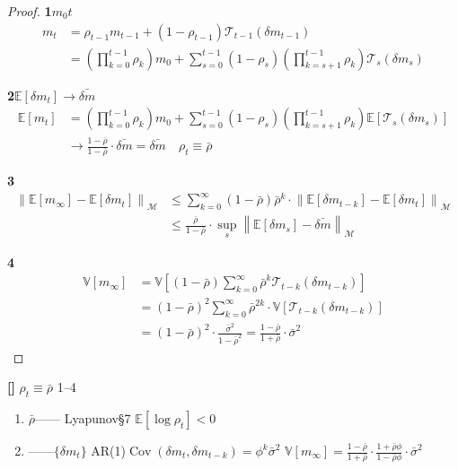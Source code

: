 \documentclass[11pt,a4paper]{article}
\theoremstyle{remark}
\DeclareMathOperator{\Cov}{Cov}
\newcommand{\Mmem}{\mathcal{M}}
\newcommand{\E}{\mathbb{E}}
\newcommand{\V}{\mathbb{V}}
\newcommand{\norm}[1]{\left\lVert#1\right\rVert}
\newcommand{\rigorous}{\textnormal{\textbf{[]}}}
\begin{document}
\begin{proof}
\textbf{1}$m_0$$t$
\begin{align}
    m_t &= \rho_{t-1} m_{t-1} + (1-\rho_{t-1})\mathcal{T}_{t-1}(\delta m_{t-1}) \nonumber\\
    &= \left(\prod_{k=0}^{t-1} \rho_k\right) m_0
       + \sum_{s=0}^{t-1} (1-\rho_s)\left(\prod_{k=s+1}^{t-1} \rho_k\right) \mathcal{T}_s(\delta m_s)
\end{align}

\textbf{2}$\E[\delta m_t] \to \bar{\delta m}$
\begin{align}
    \E[m_t] &= \left(\prod_{k=0}^{t-1} \rho_k\right) m_0
              + \sum_{s=0}^{t-1} (1-\rho_s)\left(\prod_{k=s+1}^{t-1} \rho_k\right) \E[\mathcal{T}_s(\delta m_s)] \nonumber\\
    &\to \frac{1-\bar{\rho}}{1-\bar{\rho}} \cdot \bar{\delta m}
       = \bar{\delta m} \quad\text{$\rho_t \equiv \bar{\rho}$}
\end{align}

\textbf{3}
\begin{align}
    \norm{\E[m_\infty] - \E[\delta m_t]}_{\Mmem}
    &\leq \sum_{k=0}^{\infty} (1-\bar{\rho})\bar{\rho}^k \cdot \norm{\E[\delta m_{t-k}] - \E[\delta m_t]}_{\Mmem} \nonumber\\
    &\leq \frac{\bar{\rho}}{1-\bar{\rho}} \cdot \sup_s \norm{\E[\delta m_s] - \bar{\delta m}}_{\Mmem}
\end{align}

\textbf{4}
\begin{align}
    \V[m_\infty]
    &= \V\left[(1-\bar{\rho})\sum_{k=0}^{\infty} \bar{\rho}^k \mathcal{T}_{t-k}(\delta m_{t-k})\right] \nonumber\\
    &= (1-\bar{\rho})^2 \sum_{k=0}^{\infty} \bar{\rho}^{2k} \cdot \V[\mathcal{T}_{t-k}(\delta m_{t-k})] \nonumber\\
    &= (1-\bar{\rho})^2 \cdot \frac{\bar{\sigma}^2}{1-\bar{\rho}^2}
       = \frac{1-\bar{\rho}}{1+\bar{\rho}} \cdot \bar{\sigma}^2
\end{align}
\end{proof}

\rigorous{} \textbf{$\rho_t \equiv \bar{\rho}$}
1--4

\textbf{}
\begin{enumerate}[label=(\arabic*)]
    \item $\bar{\rho}$——
          Lyapunov\S7
          $\E[\log \rho_t] < 0$
    \item ——$\{\delta m_t\}$
          AR(1)$\Cov(\delta m_t, \delta m_{t-k}) = \phi^k \bar{\sigma}^2$
          $\V[m_\infty] = \frac{1-\bar{\rho}}{1+\bar{\rho}} \cdot \frac{1+\bar{\rho}\phi}{1-\bar{\rho}\phi} \cdot \bar{\sigma}^2$
\end{enumerate}
\end{document}
